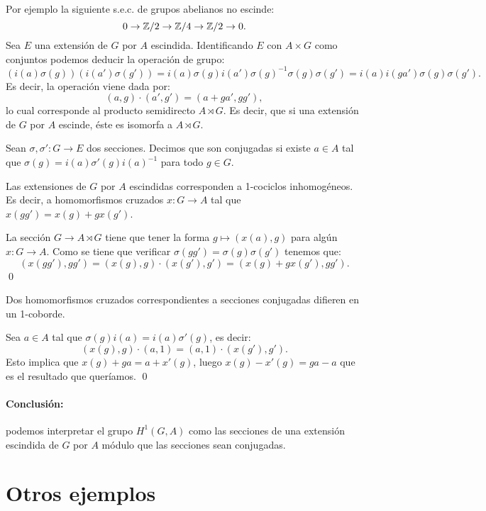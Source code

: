 \documentclass[a4paper,12pt, leqno]{article}
\begin{document}
Por ejemplo la siguiente s.e.c. de grupos abelianos no escinde:
\begin{equation*}
0 \rightarrow \mathbb{Z} /2 \rightarrow \mathbb{Z} /4 \rightarrow \mathbb{Z} /2 \rightarrow 0.
\end{equation*}
Sea $E$ una extensión de $G$ por $A$ escindida. Identificando $E$ con $A \times G$ como conjuntos podemos deducir la operación de grupo:
\begin{equation*}
(i(a)\sigma(g))(i(a')\sigma(g'))=i(a)\sigma(g)i(a')\sigma(g)^{-1} \sigma(g) \sigma(g')=i(a)i(ga')\sigma(g) \sigma(g').
\end{equation*}
Es decir, la operación viene dada por: 
\begin{equation*}
(a,g)\cdot(a',g')=(a+ga',gg'),
\end{equation*}
lo cual corresponde al producto semidirecto $A\rtimes G$. Es decir, que si una extensión de $G$ por $A$ escinde, éste es isomorfa a $A \rtimes G$.
\begin{definicion}
	Sean $\sigma, \sigma': G \rightarrow E$ dos secciones. Decimos que son conjugadas si existe $a\in A$ tal que $\sigma(g)=i(a)\sigma'(g)i(a)^{-1}$ para todo $g\in G$.
	\end{definicion}
\begin{prop} Las extensiones de $G$ por $A$ escindidas corresponden a 1-cociclos inhomogéneos. Es decir, a homomorfismos cruzados $x:G \rightarrow A$ tal que $x(gg')=x(g)+gx(g')$. 
	\end{prop}
\begin{dem}
	La sección $G \rightarrow A \rtimes G$ tiene que tener la forma $g \mapsto (x(a),g)$ para algún $x:G \rightarrow A$. Como se tiene que verificar $\sigma(g g')=\sigma(g) \sigma(g')$ tenemos que: 
	\begin{equation*}
	(x(gg'),gg')=(x(g),g)\cdot (x(g'),g')=(x(g)+gx(g'),gg').
	\end{equation*}\qed
	\end{dem}
\begin{prop}
	Dos homomorfismos cruzados correspondientes a secciones conjugadas difieren en un 1-coborde. 
	\end{prop}
\begin{dem}
	Sea $a \in A$ tal que $\sigma(g)i(a)=i(a)\sigma'(g)$, es decir: 
	\begin{equation*}
	(x(g),g)\cdot (a,1)=(a,1)\cdot(x(g'),g').
	\end{equation*}
	Esto implica que $x(g)+ga=a+x'(g)$, luego $x(g)-x'(g)=ga-a$ que es el resultado que queríamos. \qed
	\end{dem}
\paragraph{Conclusión:}
podemos interpretar el grupo $H^1(G,A)$ como las secciones de una extensión escindida de $G$ por $A$ módulo que las secciones sean conjugadas. 
\section{Otros ejemplos}
\begin{teor}
	\end{teor}
\end{document}

